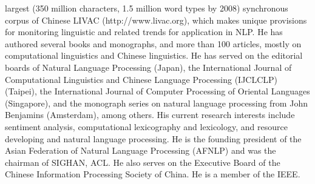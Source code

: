 \documentclass[english]{jnlp_1.4}
\begin{document}
\begin{biography}
{largest (350 million characters, 1.5 million word types by 2008) synchronous corpus of Chinese LIVAC (http://www.livac.org), which makes unique provisions for monitoring linguistic and related trends for application in NLP. He has authored several books and monographs, and more than 100 articles, mostly on computational linguistics and Chinese linguistics. He has served on the editorial boards of Natural Language Processing (Japan), the International Journal of Computational Linguistics and Chinese Language Processing (IJCLCLP) (Taipei), the International Journal of Computer Processing of Oriental Languages (Singapore), and the monograph series on natural language processing from John Benjamins (Amsterdam), among others. His current research interests include sentiment analysis, computational lexicography and lexicology, and resource developing and natural language processing. He is the founding president of the Asian Federation of Natural Language Processing (AFNLP) and was the chairman of SIGHAN, ACL. He also serves on the Executive Board of the Chinese Information Processing Society of China. He is a member of the IEEE.
}
\end{biography}


\biodate
\end{document}
